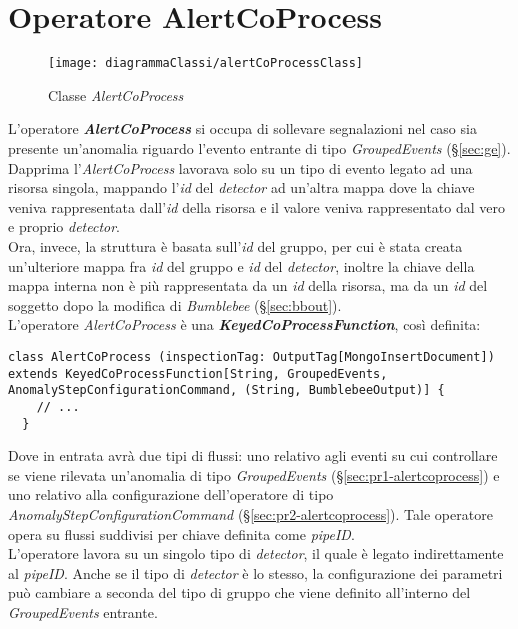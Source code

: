 \section{Operatore AlertCoProcess}\label{sec:alertcoprocess}
\begin{figure}[H] 
    \centering 
    \texttt{[image: diagrammaClassi/alertCoProcessClass]} 
    \caption{Classe \textit{AlertCoProcess}}
\end{figure}
L'operatore \textbf{\textit{AlertCoProcess}} si occupa di sollevare segnalazioni nel caso sia presente un'anomalia riguardo l'evento entrante di tipo \textit{GroupedEvents} (\S\ref{sec:ge}). Dapprima l'\textit{AlertCoProcess} lavorava solo su un tipo di evento legato ad una risorsa singola, mappando l'\textit{id} del \textit{detector} ad un'altra mappa dove la chiave veniva rappresentata dall'\textit{id} della risorsa e il valore veniva rappresentato dal vero e proprio \textit{detector}.\\
Ora, invece, la struttura è basata sull'\textit{id} del gruppo, per cui è stata creata un'ulteriore mappa fra \textit{id} del gruppo e \textit{id} del \textit{detector}, inoltre la chiave della mappa interna non è più rappresentata da un \textit{id} della risorsa, ma da un \textit{id} del soggetto dopo la modifica di \textit{Bumblebee} (\S\ref{sec:bbout}).\\
L'operatore \textit{AlertCoProcess} è una \textbf{\textit{KeyedCoProcessFunction}}, così definita:
\begin{verbatim}
class AlertCoProcess (inspectionTag: OutputTag[MongoInsertDocument]) extends KeyedCoProcessFunction[String, GroupedEvents, AnomalyStepConfigurationCommand, (String, BumblebeeOutput)] {
	// ...
  }
\end{verbatim}
Dove in entrata avrà due tipi di flussi: uno relativo agli eventi su cui controllare se viene rilevata un'anomalia di tipo \textit{GroupedEvents} (\S\ref{sec:pr1-alertcoprocess}) e uno relativo alla configurazione dell'operatore di tipo \textit{AnomalyStepConfigurationCommand} (\S\ref{sec:pr2-alertcoprocess}). Tale operatore opera su flussi suddivisi per chiave definita come \textit{pipeID}.\\
L'operatore lavora su un singolo tipo di \textit{detector}, il quale è legato indirettamente al \textit{pipeID}. Anche se il tipo di \textit{detector} è lo stesso, la configurazione dei parametri può cambiare a seconda del tipo di gruppo che viene definito all'interno del \textit{GroupedEvents} entrante.


